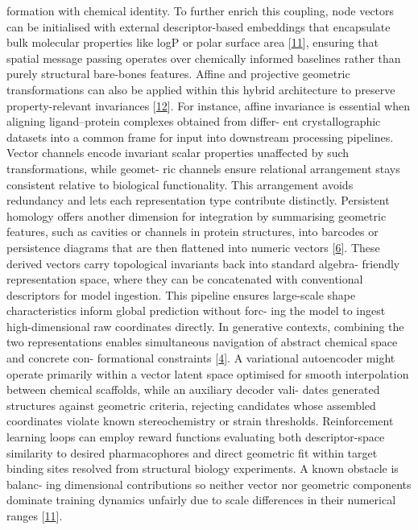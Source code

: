 \documentclass[
]{article}
\begin{document}
formation with chemical identity. To further enrich this coupling, node
vectors can be initialised with external descriptor-based embeddings
that encapsulate bulk molecular properties like logP or polar surface
area {[}\hyperref[_bookmark51]{11}{]}, ensuring that spatial message
passing operates over chemically informed baselines rather than purely
structural bare-bones features. Affine and projective geometric
transformations can also be applied within this hybrid architecture to
preserve property-relevant invariances {[}\hyperref[_bookmark52]{12}{]}.
For instance, affine invariance is essential when aligning
ligand--protein complexes obtained from differ- ent crystallographic
datasets into a common frame for input into downstream processing
pipelines. Vector channels encode invariant scalar properties unaffected
by such transformations, while geomet- ric channels ensure relational
arrangement stays consistent relative to biological functionality. This
arrangement avoids redundancy and lets each representation type
contribute distinctly. Persistent homology offers another dimension for
integration by summarising geometric features, such as cavities or
channels in protein structures, into barcodes or persistence diagrams
that are then flattened into numeric vectors
{[}\hyperref[_bookmark46]{6}{]}. These derived vectors carry topological
invariants back into standard algebra- friendly representation space,
where they can be concatenated with conventional descriptors for model
ingestion. This pipeline ensures large-scale shape characteristics
inform global prediction without forc- ing the model to ingest
high-dimensional raw coordinates directly. In generative contexts,
combining the two representations enables simultaneous navigation of
abstract chemical space and concrete con- formational constraints
{[}\hyperref[_bookmark44]{4}{]}. A variational autoencoder might operate
primarily within a vector latent space optimised for smooth
interpolation between chemical scaffolds, while an auxiliary decoder
vali- dates generated structures against geometric criteria, rejecting
candidates whose assembled coordinates violate known stereochemistry or
strain thresholds. Reinforcement learning loops can employ reward
functions evaluating both descriptor-space similarity to desired
pharmacophores and direct geometric fit within target binding sites
resolved from structural biology experiments. A known obstacle is
balanc- ing dimensional contributions so neither vector nor geometric
components dominate training dynamics unfairly due to scale differences
in their numerical ranges {[}\hyperref[_bookmark51]{11}{]}.
\end{document}
